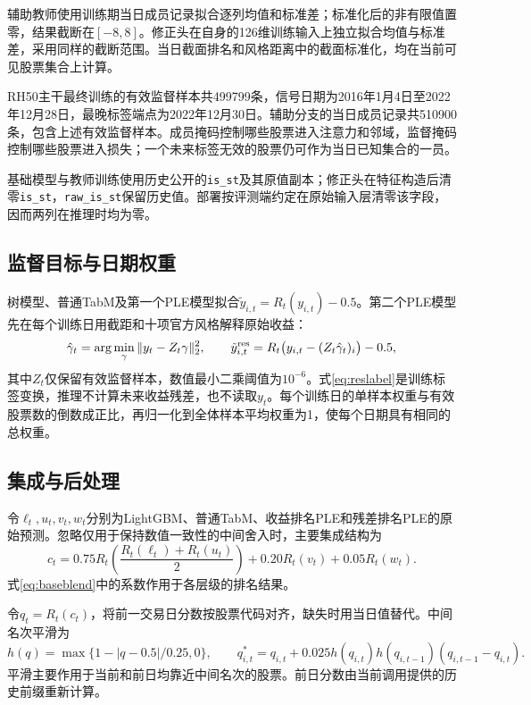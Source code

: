 \documentclass[UTF8,11pt,a4paper,fontset=fandol]{ctexart}
\begin{document}
辅助教师使用训练期当日成员记录拟合逐列均值和标准差；标准化后的非有限值置零，结果截断在$[-8,8]$。修正头在自身的126维训练输入上独立拟合均值与标准差，采用同样的截断范围。当日截面排名和风格距离中的截面标准化，均在当前可见股票集合上计算。

RH50主干最终训练的有效监督样本共499799条，信号日期为2016年1月4日至2022年12月28日，最晚标签端点为2022年12月30日。辅助分支的当日成员记录共510900条，包含上述有效监督样本。成员掩码控制哪些股票进入注意力和邻域，监督掩码控制哪些股票进入损失；一个未来标签无效的股票仍可作为当日已知集合的一员。

基础模型与教师训练使用历史公开的\texttt{is\_st}及其原值副本；修正头在特征构造后清零\texttt{is\_st}，\texttt{raw\_is\_st}保留历史值。部署按评测端约定在原始输入层清零该字段，因而两列在推理时均为零。

\subsection{监督目标与日期权重}
树模型、普通TabM及第一个PLE模型拟合$\tilde y_{i,t}=R_t(y_{i,t})-0.5$。第二个PLE模型先在每个训练日用截距和十项官方风格解释原始收益：
\begin{equation}
 \hat\gamma_t=\arg\min_\gamma\|y_t-Z_t\gamma\|_2^2,\qquad
 \tilde y^{\rm res}_{i,t}=R_t\bigl(y_{i,t}-(Z_t\hat\gamma_t)_i\bigr)-0.5,
 \label{eq:reslabel}
\end{equation}
其中$Z_t$仅保留有效监督样本，数值最小二乘阈值为$10^{-6}$。式\eqref{eq:reslabel}是训练标签变换，推理不计算未来收益残差，也不读取$y_t$。每个训练日的单样本权重与有效股票数的倒数成正比，再归一化到全体样本平均权重为1，使每个日期具有相同的总权重。

\subsection{集成与后处理}
令$\ell_t,u_t,v_t,w_t$分别为LightGBM、普通TabM、收益排名PLE和残差排名PLE的原始预测。忽略仅用于保持数值一致性的中间舍入时，主要集成结构为
\begin{equation}
 c_t=0.75R_t\!\left(\frac{R_t(\ell_t)+R_t(u_t)}{2}\right)
        +0.20R_t(v_t)+0.05R_t(w_t).
 \label{eq:baseblend}
\end{equation}
式\eqref{eq:baseblend}中的系数作用于各层级的排名结果。

令$q_t=R_t(c_t)$，将前一交易日分数按股票代码对齐，缺失时用当日值替代。中间名次平滑为
\begin{equation}
 h(q)=\max\{1-|q-0.5|/0.25,0\},\qquad
 q^*_{i,t}=q_{i,t}+0.025h(q_{i,t})h(q_{i,t-1})(q_{i,t-1}-q_{i,t}).
 \label{eq:smooth}
\end{equation}
平滑主要作用于当前和前日均靠近中间名次的股票。前日分数由当前调用提供的历史前缀重新计算。
\end{document}
